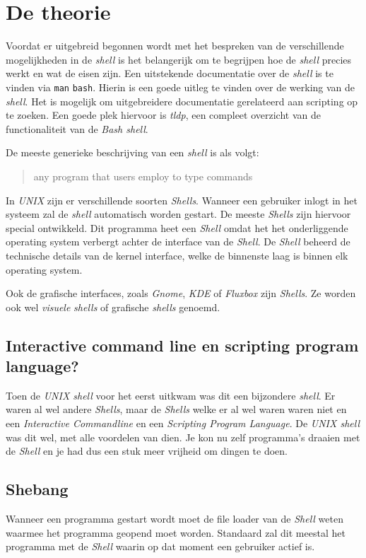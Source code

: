 \section{De theorie}
Voordat er uitgebreid begonnen wordt met het bespreken van de verschillende mogelijkheden in de \emph{shell} is het belangerijk om te begrijpen hoe de \emph{shell} precies werkt en wat de eisen zijn. Een uitstekende documentatie over de \emph{shell} is te vinden via \texttt{man} \texttt{bash}. Hierin is een goede uitleg te vinden over de werking van de \emph{shell}. Het is mogelijk om uitgebreidere documentatie gerelateerd aan scripting op te zoeken. Een goede plek hiervoor is \emph{tldp}\cite{bib.tldp.abs}, een compleet overzicht van de functionaliteit van de \emph{Bash shell}. 

De meeste generieke beschrijving van een \emph{shell} is als volgt:
\begin{quote}
any program that users employ to type commands
\end{quote}
In \emph{UNIX} zijn er verschillende soorten \emph{Shells}. Wanneer een gebruiker inlogt in het systeem zal de \emph{shell} automatisch worden gestart. De meeste \emph{Shells} zijn hiervoor special ontwikkeld. Dit programma heet een \emph{Shell} omdat het het onderliggende operating system verbergt achter de interface van de \emph{Shell}. De \emph{Shell} beheerd de technische details van de kernel interface, welke de binnenste laag is binnen elk operating system.

Ook de grafische interfaces, zoals \emph{Gnome}, \emph{KDE} of \emph{Fluxbox} zijn \emph{Shells}. Ze worden ook wel \emph{visuele} \emph{shells} of grafische \emph{shells} genoemd. \cite{bib.shell}

\subsection{Interactive command line en scripting program language?}
Toen de \emph{UNIX shell} voor het eerst uitkwam was dit een bijzondere \emph{shell}. Er waren al wel andere \emph{Shells}, maar de \emph{Shells} welke er al wel waren waren niet en een \emph{Interactive Commandline} en een \emph{Scripting Program Language}. De \emph{UNIX shell} was dit wel, met alle voordelen van dien. Je kon nu zelf programma's draaien met de \emph{Shell} en je had dus een stuk meer vrijheid om dingen te doen. 
 
\subsection{Shebang}
Wanneer een programma gestart wordt moet de file loader van de \emph{Shell} weten waarmee het programma geopend moet worden. Standaard zal dit meestal het programma met de \emph{Shell} waarin op dat moment een gebruiker actief is. 

